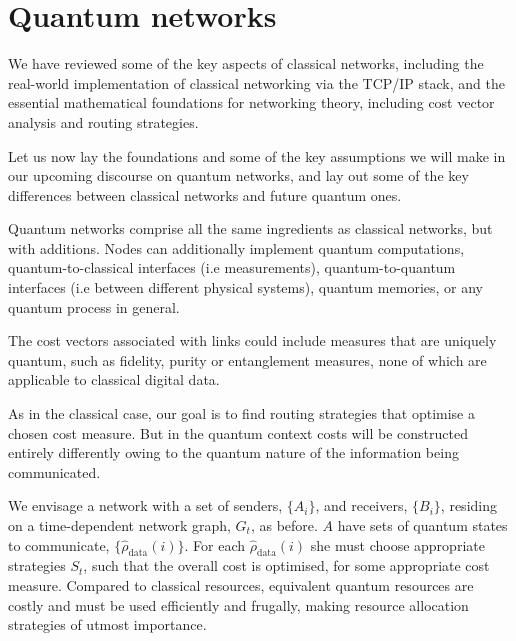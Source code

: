 %
%

\section{Quantum networks} \label{sec:quant_net} 


We have reviewed some of the key aspects of classical networks, including the real-world implementation of classical networking via the TCP/IP stack, and the essential mathematical foundations for networking theory, including cost vector analysis and routing strategies.

Let us now lay the foundations and some of the key assumptions we will make in our upcoming discourse on quantum networks, and lay out some of the key differences between classical networks and future quantum ones.

Quantum networks comprise all the same ingredients as classical networks, but with additions. Nodes can additionally implement quantum computations, quantum-to-classical interfaces (i.e measurements), quantum-to-quantum interfaces (i.e between different physical systems), quantum memories, or any quantum process in general.

The cost vectors associated with links could include measures that are uniquely quantum, such as fidelity, purity or entanglement measures, none of which are applicable to classical digital data.

As in the classical case, our goal is to find routing strategies that optimise a chosen cost measure. But in the quantum context costs will be constructed entirely differently owing to the quantum nature of the information being communicated.

We envisage a network with a set of senders, $\{A_i\}$, and receivers, $\{B_i\}$, residing on a time-dependent network graph, $G_t$, as before. $A$ have sets of quantum states to communicate, $\{\hat\rho_\text{data}(i)\}$. For each $\hat\rho_\text{data}(i)$ she must choose appropriate strategies $S_t$, such that the overall cost is optimised, for some appropriate cost measure. Compared to classical resources, equivalent quantum resources are costly and must be used efficiently and frugally, making resource allocation strategies of utmost importance.

